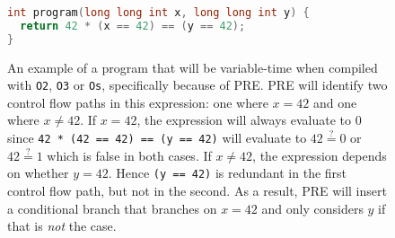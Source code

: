 \begin{figure}[H]
  \centering
  \begin{lstlisting}[style=defstyle,language={C},basicstyle=\ttfamily,breaklines=true, xleftmargin=3cm, xrightmargin=3cm]
int program(long long int x, long long int y) { 
  return 42 * (x == 42) == (y == 42); 
}\end{lstlisting} 
    \caption{An example of a program that will be variable-time when compiled with \texttt{O2}, \texttt{O3} or \texttt{Os}, specifically because of PRE.
    PRE will identify two control flow paths in this expression: one where $x=42$ and one where $x \neq 42$.
    If $x=42$, the expression will always evaluate to $0$ since \texttt{42 * (42 == 42) == (y == 42)} will evaluate to $42 \stackrel{?}{=} 0$ or $42 \stackrel{?}{=} 1$ which is false in both cases.
    If $x \neq 42$, the expression depends on whether $y=42$.
    Hence \texttt{(y == 42)} is redundant in the first control flow path, but not in the second.
    As a result, PRE will insert a conditional branch that branches on $x = 42$ and only considers $y$ if that is \textit{not} the case.}
    \label{fig:pre-example}
\end{figure}
